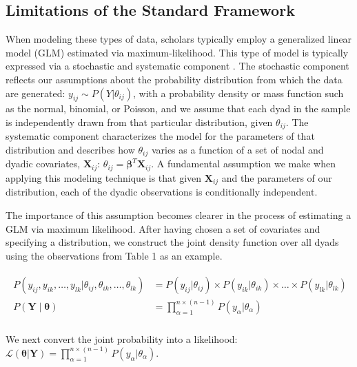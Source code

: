 \documentclass[12pt,onesided,pdflatex]{amsart}
\begin{document}
\subsection{Limitations of the Standard Framework}

When modeling these types of data, scholars typically employ a generalized linear model (GLM) estimated via maximum-likelihood. This type of model is typically expressed via a stochastic and systematic component \citep{pawitan:2013}. The stochastic component reflects our assumptions about the probability distribution from which the data are generated: $y_{ij} \sim P(Y | \theta_{ij})$, with a probability density or mass function such as the normal, binomial, or Poisson, and we assume that each dyad in the sample is independently drawn from that particular distribution, given $\theta_{ij}$. The systematic component characterizes the model for the parameters of that distribution and describes how $\theta_{ij}$ varies as a function of a set of nodal and dyadic covariates, $\mathbf{X}_{ij}$: $\theta_{ij} = \bm\beta^{T} \mathbf{X}_{ij}$. A fundamental assumption we make when applying this modeling technique is that given $\mathbf{X}_{ij}$ and the parameters of our distribution, each of the dyadic observations is conditionally independent. 

The importance of this assumption becomes clearer in the process of estimating a GLM via maximum likelihood. After having chosen a set of covariates and specifying a distribution, we construct the joint density function over all dyads using the observations from Table 1 as an example.

\vspace{-8mm}
\begin{align}
\begin{aligned}
	P(y_{ij}, y_{ik}, \ldots, y_{lk} | \theta_{ij}, \theta_{ik}, \ldots, \theta_{lk}) &= P(y_{ij} | \theta_{ij}) \times P(y_{ik} | \theta_{ik}) \times \ldots \times P(y_{lk} | \theta_{lk}) \\
	P(\mathbf{Y} \; | \; \bm{\theta}) &= \prod_{\alpha=1}^{n \times (n-1)} P(y_{\alpha} | \theta_{\alpha})  \\
\end{aligned}
\end{align}

\noindent We next convert the joint probability into a likelihood: $\displaystyle \mathcal{L} (\bm{\theta} | \mathbf{Y}) = \prod_{\alpha=1}^{n \times (n-1)} P(y_{\alpha} | \theta_{\alpha})$.
\end{document}
